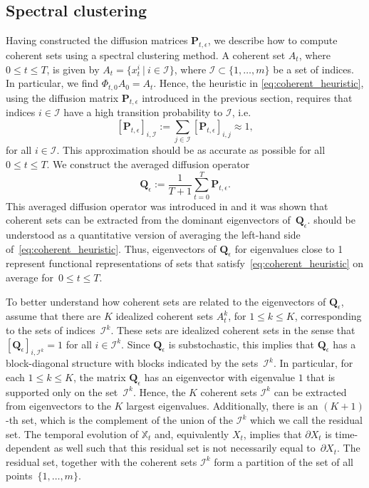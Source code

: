 \subsection{Spectral clustering} \label{sec:CS_clust}
Having constructed the diffusion matrices $\mathbf{P}_{t,\epsilon}$, we describe how to compute coherent sets using a spectral clustering method. A coherent set $A_t$, where $0\leq t \leq T$, is given by $A_t=\{x_t^i \: | \: i\in \mathcal{I}\}$, where $\mathcal{I} \subset \{1, \hdots, m\}$ be a set of indices. In particular, we find $\Phi_{t,0} A_0 = A_t$. Hence, the heuristic in \cref{eq:coherent_heuristic}, using the diffusion matrix $\mathbf{P}_{t,\epsilon}$ introduced in the previous section, requires that indices $i\in \mathcal{I}$ have a high transition probability to $\mathcal{I}$, i.e.
\begin{equation*}
    \left[\mathbf{P}_{t,\epsilon}\right]_{i, \mathcal{I}} := \sum_{j\in \mathcal{I}} \left[\mathbf{P}_{t,\epsilon}\right]_{i, j} \approx 1,
\end{equation*}
for all $i\in \mathcal{I}$. This approximation should be as accurate as possible for all $0 \leq t \leq T$. We construct the averaged diffusion operator
\begin{equation}
    \label{eq:avg_dmap}
    \mathbf{Q}_\epsilon := \frac{1}{T+1} \sum_{t=0}^T \mathbf{P}_{t, \epsilon}.
\end{equation}
This averaged diffusion operator was introduced in \textcite{froylandDynamicIsoperimetryGeometry2015} and it was shown that coherent sets can be extracted from the dominant eigenvectors of~$\mathbf{Q}_\epsilon$.
 should be understood as a quantitative version of averaging the left-hand side of~\cref{eq:coherent_heuristic}. Thus, eigenvectors of $\mathbf{Q}_\epsilon$ for eigenvalues close to 1 represent functional representations of sets that satisfy~\cref{eq:coherent_heuristic} on average for~$0\leq t \leq T$.

To better understand how coherent sets are related to the eigenvectors of $\mathbf{Q}_\epsilon$, assume that there are $K$  idealized coherent sets $A_t^k$, for $1\leq k \leq K$, corresponding to the sets of indices~$\mathcal{I}^k$. These sets are idealized coherent sets in the sense that $\left[\mathbf{Q}_\epsilon\right]_{i, \mathcal{I}^k}= 1$ for all $i\in \mathcal{I}^k$. Since $\mathbf{Q}_\epsilon$ is substochastic, this implies that $\mathbf{Q}_\epsilon$ has a block-diagonal structure with blocks indicated by the sets~$\mathcal{I}^k$. In particular, for each $1\leq k \leq K$, the matrix $\mathbf{Q}_\epsilon$ has an eigenvector with eigenvalue $1$ that is supported only on the set~$\mathcal{I}^k$. Hence, the $K$ coherent sets $\mathcal{I}^k$ can be extracted from eigenvectors to the $K$ largest eigenvalues. Additionally, there is an $(K+1)$-th set, which is the complement of the union of the $\mathcal{I}^k$ which we call the residual set. The temporal evolution of $\mathbb{X}_t$ and, equivalently $X_t$, implies that $\partial X_t$ is time-dependent as well such that this residual set is not necessarily equal to~$\partial X_t$. The residual set, together with the coherent sets $\mathcal{I}^k$ form a partition of the set of all points~$\{1, \hdots, m\}$.

